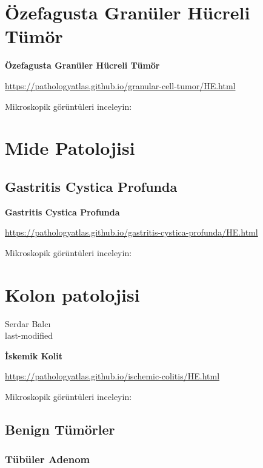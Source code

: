 \documentclass[
  letterpaper,
  DIV=11,
  numbers=noendperiod]{scrreprt}
\begin{document}
\hypertarget{uxf6zefagusta-granuxfcler-huxfccreli-tuxfcmuxf6r}{%
\chapter{Özefagusta Granüler Hücreli
Tümör}\label{uxf6zefagusta-granuxfcler-huxfccreli-tuxfcmuxf6r}}

\textbf{Özefagusta Granüler Hücreli Tümör}

\url{https://pathologyatlas.github.io/granular-cell-tumor/HE.html}

Mikroskopik görüntüleri inceleyin:

\hypertarget{mide-patolojisi}{%
\chapter{Mide Patolojisi}\label{mide-patolojisi}}

\hypertarget{gastritis-cystica-profunda}{%
\section{Gastritis Cystica Profunda}\label{gastritis-cystica-profunda}}

\textbf{Gastritis Cystica Profunda}

\url{https://pathologyatlas.github.io/gastritis-cystica-profunda/HE.html}

Mikroskopik görüntüleri inceleyin:

\hypertarget{kolon-patolojisi}{%
\chapter{Kolon patolojisi}\label{kolon-patolojisi}}

Serdar Balcı\\
last-modified

\hfill\break

\textbf{İskemik Kolit}

\url{https://pathologyatlas.github.io/ischemic-colitis/HE.html}

Mikroskopik görüntüleri inceleyin:

\hypertarget{benign-tuxfcmuxf6rler-1}{%
\section{Benign Tümörler}\label{benign-tuxfcmuxf6rler-1}}

\hypertarget{tuxfcbuxfcler-adenom-1}{%
\subsection{Tübüler Adenom}\label{tuxfcbuxfcler-adenom-1}}
\end{document}
